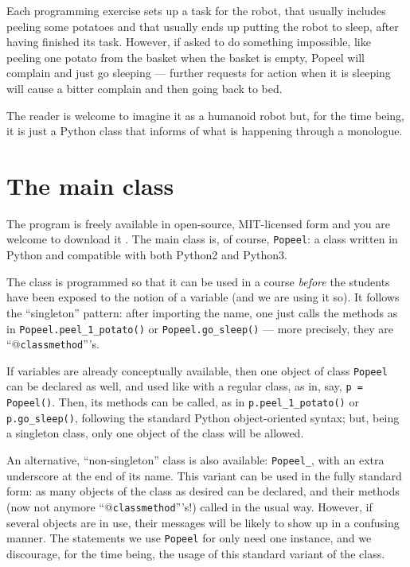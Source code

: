 \documentclass[12pt]{article}
\begin{document}
Each programming exercise sets up a task for the
robot, that usually includes peeling some potatoes
and that usually ends up putting the robot to sleep,
after having finished its task. However, if asked to
do something impossible, like peeling one potato
from the basket
when the basket is empty, Popeel will complain and
just go sleeping --- further requests for action
when it is sleeping will cause a bitter complain
and then going back to bed.

The reader is welcome to imagine it as a humanoid 
robot but, for the time being, it is just a Python 
class that informs of what is happening through
a monologue.


\section{The main class}

The program is freely available in open-source,
MIT-licensed form \cite{MITlicense} and you are welcome
to download it \cite{Popeel}.
The main class is, of course, {\tt Popeel}: a class
written in Python and compatible with both
Python2 and Python3.

The class is programmed so that it can be used in a course
{\it before} the students have been exposed to the 
notion of a variable (and we are using it so).
It follows the ``singleton'' pattern: after 
importing the name, one just calls the methods as in 
{\tt Popeel.peel_1_potato()} or {\tt Popeel.go_sleep()}
 --- more precisely, they are ``@{\tt classmethod}'''s.

If variables are already conceptually available, then
one object of class {\tt Popeel} 
can be declared as well, and used like with a regular class,
as in, say, {\tt p = Popeel()}. Then, its methods
can be called, as in {\tt p.peel_1_potato()} or
{\tt p.go_sleep()}, following the standard
Python object-oriented syntax; but, being a
singleton class, only one object of the class
will be allowed. 

An alternative, ``non-singleton'' class is also 
available: {\tt Popeel_}, with an extra underscore
at the end of its name. This variant can be used in the
fully standard form: as many objects of the class 
as desired can be declared, and their 
methods (now not anymore ``@{\tt classmethod}'''s!) %
called in the usual way. However, if several
objects are in use, their messages will be likely
to show up in a confusing manner. The statements
we use {\tt Popeel} for only need one instance, and
we discourage, for the time being, the usage of this 
standard variant of the class.
\end{document}
